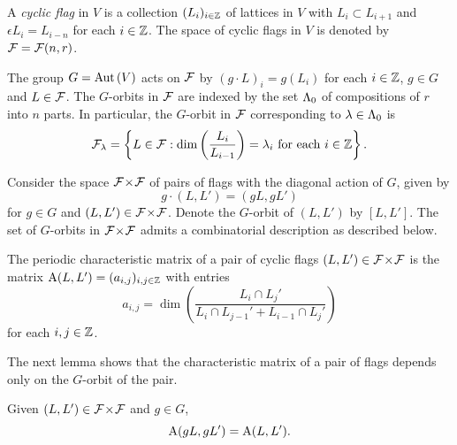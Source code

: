 \documentclass[a4paper, 11pt]{report}
\begin{document}
\begin{definition}\label{definition:cyclic-flags}
A \emph{cyclic flag} in $V$ is a collection $(L_i)_{i\in\mathbb{Z}}$ of lattices in $V$ with $L_i\subset L_{i+1}$ and $\epsilon L_i = L_{i-n}$ for each $i\in\mathbb{Z}$. The space of cyclic flags in $V$ is denoted by $\mathcal{F}=\mathcal{F}(n,r)$.
\end{definition}

The group $G=\operatorname{Aut}{(V)}$ acts on $\mathcal{F}$ by $(g\cdot L)_i = g(L_i)$ for each $i\in\mathbb{Z}$, $g\in G$ and $L\in\mathcal{F}$. The $G$-orbits in $\mathcal{F}$ are indexed by the set $\Lambda_0{}$ of compositions of $r$ into $n$ parts. In particular, the $G$-orbit in $\mathcal{F}$ corresponding to $\lambda\in\Lambda_0{}$ is
\begin{equation*}
\mathcal{F}_\lambda = \left\{L\in\mathcal{F}: \dim\left(\frac{L_i}{L_{i-1}}\right) = \lambda_i \text{ for each } i\in\mathbb{Z}\right\}.
\end{equation*}

Consider the space ${\mathcal{F}\!\times\!\mathcal{F}}$ of pairs of flags with the diagonal action of $G$, given by
\begin{equation*}
g\cdot(L,L') = (gL,gL')
\end{equation*}
for $g\in G$ and $(L,L')\in{\mathcal{F}\!\times\!\mathcal{F}}$. Denote the $G$-orbit of $(L,L')$ by $[L,L']$. The set of $G$-orbits in ${\mathcal{F}\!\times\!\mathcal{F}}$ admits a combinatorial description as described below.

\begin{definition}\label{def:characteristic-matrix}
The periodic characteristic matrix of a pair of cyclic flags $(L,L')\in{\mathcal{F}\!\times\!\mathcal{F}}$ is the matrix $\operatorname{A}(L,L')=(a_{i,j})_{i,j\in\mathbb{Z}}$ with entries
\begin{equation*}
a_{i,j} = \dim\left(\frac{L_i\cap L_j'}{L_i\cap L_{j-1}' + L_{i-1}\cap L_j'}\right)
\end{equation*}
for each $i,j\in\mathbb{Z}$.
\end{definition}

The next lemma shows that the characteristic matrix of a pair of flags depends only on the $G$-orbit of the pair.
\begin{lemma}
Given $(L,L')\in{\mathcal{F}\!\times\!\mathcal{F}}$ and $g\in G$,
\begin{equation*}
\operatorname{A}(gL,gL') = \operatorname{A}(L,L').
\end{equation*}
\end{lemma}
\end{document}
